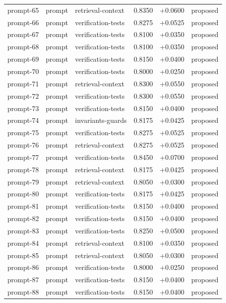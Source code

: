 \begin{center}
\begin{longtable}{llp{5.2cm}rrl}
prompt-65 & prompt & retrieval-context & 0.8350 & +0.0600 & proposed \\
prompt-66 & prompt & verification-tests & 0.8275 & +0.0525 & proposed \\
prompt-67 & prompt & verification-tests & 0.8100 & +0.0350 & proposed \\
prompt-68 & prompt & verification-tests & 0.8100 & +0.0350 & proposed \\
prompt-69 & prompt & verification-tests & 0.8150 & +0.0400 & proposed \\
prompt-70 & prompt & verification-tests & 0.8000 & +0.0250 & proposed \\
prompt-71 & prompt & retrieval-context & 0.8300 & +0.0550 & proposed \\
prompt-72 & prompt & verification-tests & 0.8300 & +0.0550 & proposed \\
prompt-73 & prompt & verification-tests & 0.8150 & +0.0400 & proposed \\
prompt-74 & prompt & invariants-guards & 0.8175 & +0.0425 & proposed \\
prompt-75 & prompt & verification-tests & 0.8275 & +0.0525 & proposed \\
prompt-76 & prompt & retrieval-context & 0.8275 & +0.0525 & proposed \\
prompt-77 & prompt & verification-tests & 0.8450 & +0.0700 & proposed \\
prompt-78 & prompt & retrieval-context & 0.8175 & +0.0425 & proposed \\
prompt-79 & prompt & retrieval-context & 0.8050 & +0.0300 & proposed \\
prompt-80 & prompt & verification-tests & 0.8175 & +0.0425 & proposed \\
prompt-81 & prompt & verification-tests & 0.8150 & +0.0400 & proposed \\
prompt-82 & prompt & verification-tests & 0.8150 & +0.0400 & proposed \\
prompt-83 & prompt & verification-tests & 0.8250 & +0.0500 & proposed \\
prompt-84 & prompt & retrieval-context & 0.8100 & +0.0350 & proposed \\
prompt-85 & prompt & retrieval-context & 0.8050 & +0.0300 & proposed \\
prompt-86 & prompt & verification-tests & 0.8000 & +0.0250 & proposed \\
prompt-87 & prompt & verification-tests & 0.8150 & +0.0400 & proposed \\
prompt-88 & prompt & verification-tests & 0.8150 & +0.0400 & proposed \\

\end{longtable}
\end{center}
